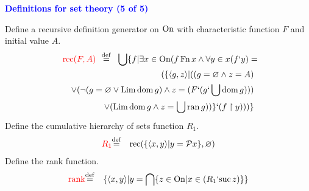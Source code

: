 \documentclass{slides}
\begin{document}
\begin{slide}

\begin{center}
\textcolor{blue}{\textbf{Definitions for set theory (5 of 5)}}
\end{center}

Define a recursive definition generator on ${\rm On}$
 with characteristic function $F$ and initial value $A$.
\begin{eqnarray}
\lefteqn{\textcolor{red}{{\rm rec} ( F , A )} \ \  {\buildrel\rm def\over =}
 \ \ \bigcup \{ f | \exists x \in {\rm On} ( f \,{\rm Fn}\,
x \wedge \forall y \in x ( f ` y ) =} \nonumber \\
& & ( \{ \langle g , z \rangle | ( ( g =   \varnothing \wedge z = A ) \nonumber \\
& & \vee ( \lnot ( g = \varnothing  \vee {\rm Lim}\,  {\rm dom}\, g )
\wedge \nonumber z = ( F ` ( g ` \bigcup {\rm dom}\,
 g ) ) )  \\
& &  \vee ( {\rm Lim}\,  {\rm dom}\, g \wedge z = \bigcup {\rm ran}\,
 g ) ) \} ` ( f \restriction y ) ) ) \}  \label{dfrdg2}
\end{eqnarray}
Define the cumulative hierarchy of sets function $R_1$.
\begin{eqnarray}
\textcolor{red}{R_1} & {\buildrel\rm def\over =} &  {\rm rec} ( \{ \langle x , y \rangle | y = {\cal P} x \} ,
\varnothing ) \label{df-r1}
\end{eqnarray}
Define the rank function.
\begin{eqnarray}
\textcolor{red}{{\rm rank}} & {\buildrel\rm def\over =} &
\{ \langle x , y \rangle | y = \bigcap \{ z \in {\rm On} |
x \in ( R_1 ` {\rm suc}\, z ) \} \} \label{df-rank}
\end{eqnarray}


\end{slide}
\end{document}
